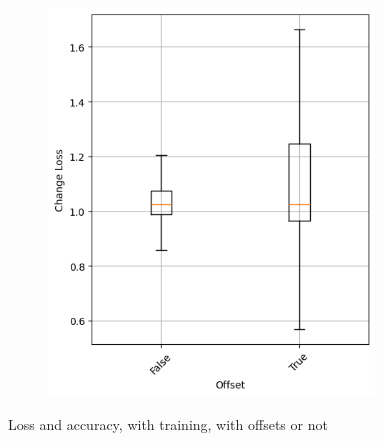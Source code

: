 \begin{figure}
\begin{subfigure}{0.5\textwidth}
        \includegraphics[width=0.95\textwidth]{plots/Offset_Trained_loss.png}
    \end{subfigure}
    \caption{Loss and accuracy, with training, with offsets or not}
    \label{fig:offset-training}
\end{figure}
